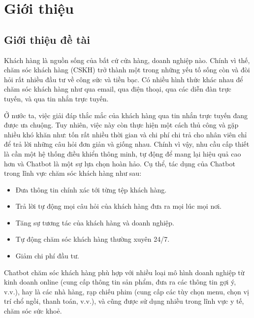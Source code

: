 \chapter {Giới thiệu}
	
\section{Giới thiệu đề tài}
Khách hàng là nguồn sống của bất cứ cửa hàng, doanh nghiệp nào. Chính vì thế, chăm sóc khách hàng (CSKH) trở thành một trong những yếu tố sống còn và đòi hỏi rất nhiều đầu tư về công sức và tiền bạc. Có nhiều hình thức khác nhau để chăm sóc khách hàng như qua email, qua điện thoại, qua các diễn đàn trực tuyến, và qua tin nhắn trực tuyến.

Ở nước ta, việc giải đáp thắc mắc của khách hàng qua tin nhắn trực tuyến đang được ưa chuộng. Tuy nhiên, việc này còn thực hiện một cách thủ công và gặp nhiều khó khăn như: tốn rất nhiều thời gian và chi phí chi trả cho nhân viên chỉ để trả lời những câu hỏi đơn giản và giống nhau. Chính vì vậy, nhu cầu cấp thiết là cần một hệ thống điều khiển thông minh, tự động để mang lại hiệu quả cao hơn và Chatbot là một sự lựa chọn hoàn hảo. Cụ thể, tác dụng của Chatbot trong lĩnh vực chăm sóc khách hàng như sau:

\begin{itemize}
    \item Đưa thông tin chính xác tới từng tệp khách hàng.
    \item Trả lời tự động mọi câu hỏi của khách hàng đưa ra mọi lúc mọi nơi.
    \item Tăng sự tương tác của khách hàng và doanh nghiệp.
    \item Tự động chăm sóc khách hàng thường xuyên 24/7.
    \item Giảm chi phí đầu tư.
\end{itemize}

Chatbot chăm sóc khách hàng phù hợp với nhiều loại mô hình doanh nghiệp từ kinh doanh online (cung cấp thông tin sản phẩm, đưa ra các thông tin gợi ý, v.v.), hay là các nhà hàng, rạp chiếu phim (cung cấp các tùy chọn menu, chọn vị trí chổ ngồi, thanh toán, v.v.), và cũng được sử dụng nhiều trong lĩnh vực y tế, chăm sóc sức khoẻ.

